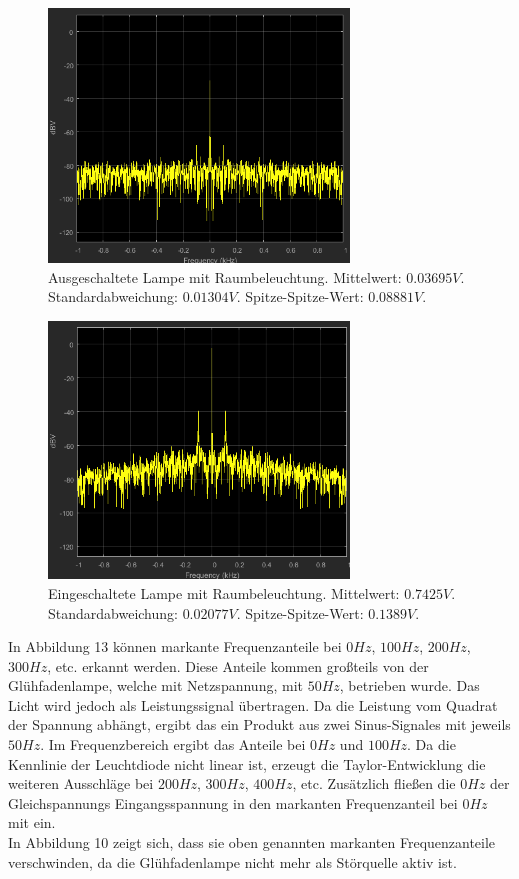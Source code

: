 \documentclass[a4paper,12pt]{article}
\begin{document}
	\begin{figure}[H]
		\centering
		\includegraphics[width=8cm]{assets/raumbel}
		\caption{Ausgeschaltete Lampe mit Raumbeleuchtung. Mittelwert: $0.03695V$. Standardabweichung: $0.01304V$. Spitze-Spitze-Wert: $0.08881V$.}
	\end{figure}
	\begin{figure}[H]
		\centering
		\includegraphics[width=8cm]{assets/lampe-raumbel}
		\caption{Eingeschaltete Lampe mit Raumbeleuchtung. Mittelwert: $0.7425V$. Standardabweichung: $0.02077V$. Spitze-Spitze-Wert: $0.1389V$.}
	\end{figure}
	\noindent
	In Abbildung 13 können markante Frequenzanteile bei $0Hz$, $100Hz$, $200Hz$, $300Hz$, etc. erkannt werden. Diese Anteile kommen großteils von der Glühfadenlampe, welche mit Netzspannung, mit $50Hz$, betrieben wurde.\newline
	Das Licht wird jedoch als Leistungssignal übertragen. Da die Leistung vom Quadrat der Spannung abhängt, ergibt das ein Produkt aus zwei Sinus-Signales mit jeweils $50Hz$. Im Frequenzbereich ergibt das Anteile bei $0Hz$ und $100Hz$. Da die Kennlinie der Leuchtdiode nicht linear ist, erzeugt die Taylor-Entwicklung die weiteren Ausschläge bei $200Hz$, $300Hz$, $400Hz$, etc.\newline
	Zusätzlich fließen die $0Hz$ der Gleichspannungs Eingangsspannung in den markanten Frequenzanteil bei $0Hz$ mit ein.\\ \newline
	In Abbildung 10 zeigt sich, dass sie oben genannten markanten Frequenzanteile verschwinden, da die Glühfadenlampe nicht mehr als Störquelle aktiv ist.\newline
	\newpage
\end{document}
